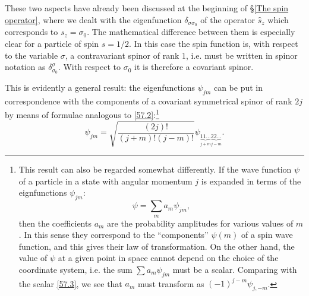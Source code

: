 These two aspects have already been discussed at the beginning of \S\ref{The spin operator}, where we dealt with the eigenfunction $ \delta_{\sigma\sigma_0} $ of the operator $ \hat{s}_z $ which corresponds to $ s_z = \sigma_0 $. The mathematical difference between them is especially clear for a particle of spin $ s = 1/2 $. In this case the spin function is, with respect to the variable $\sigma$, a contravariant spinor of rank $ 1 $, i.e. must be written in spinor notation as $\delta^\sigma_{\sigma_0}$. With respect to $\sigma_0$ it is therefore a covariant spinor.

This is evidently a general result: the eigenfunctions $\psi_{jm}$ can be put in correspondence with the components of a covariant symmetrical spinor of rank $ 2j $ by means of formulae analogous to \eqref{57.2}:\footnote{This result can also be regarded somewhat differently. If the wave function $\psi$ of a particle in a state with angular momentum $ j $ is expanded in terms of the eignfunctions $\psi_{jm}$:
\[ \psi=\sum_{m}a_m\psi_{jm}, \]
then the coefficients $ a_m $ are the probability amplitudes for various values of $ m $. In this sense they correspond to the “components” $ \psi(m) $ of a spin wave function, and this gives their law of transformation. On the other hand, the value of $\psi$ at a given point in space cannot depend on the choice of the coordinate system, i.e. the sum $ \sum a_m\psi_{jm} $ must be a scalar. Comparing with the scalar \eqref{57.3}, we see that $ a_m $ must transform as $ (-1)^{j-m}\psi_{j,-m} $.}
\begin{equation}\label{57.6}
\psi_{jm}=\sqrt{\frac{(2j)!}{(j+m)!(j-m)!}}\psi_{\underbrace{11\dots}_{j+m}\underbrace{22\dots}_{j-m}}.
\end{equation}


